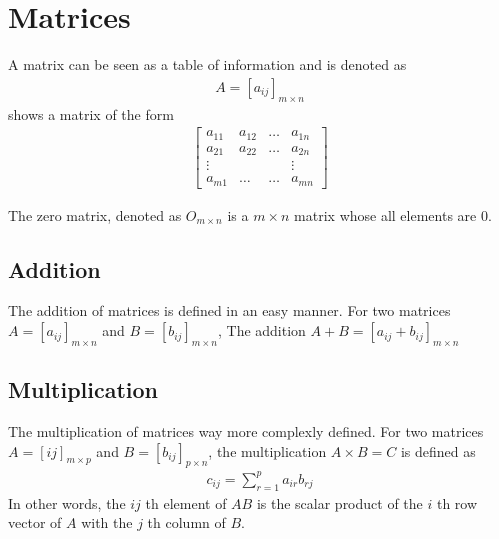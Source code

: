 \documentclass[a4paper]{article}
\theoremstyle{plain}
\theoremstyle{definition}
\newtheorem{defn}{Definition}[section]
\theoremstyle{remark}
\begin{document}
\section{Matrices}
\begin{tcolorbox}[colback=black!3!white,colframe=black!60!white,title=\begin{defn}Matrix \label{Matrix}\end{defn}]
A matrix can be seen as a table of information and is denoted as
\begin{align}
	A = [a_{ij}]_{m \times n}
\end{align}
shows a matrix of the form
\begin{align} \left[
	\begin{array}{cccc}
		a_{11} & a_{12} & \ldots & a_{1n} \\
		a_{21} & a_{22} & \ldots & a_{2n} \\
		\vdots & & & \vdots \\
		a_{m1} & \ldots & \ldots & a_{mn}
	\end{array}\right]
\end{align}
\end{tcolorbox}
\begin{tcolorbox}[colback=black!3!white,colframe=black!60!white,title=\begin{defn}Zero Matrix \label{Zero Matrix}\end{defn}]
The zero matrix, denoted as $O_{m \times n}$ is a $m \times n$ matrix whose all elements are $0$.
\end{tcolorbox}
\subsection{Addition}
The addition of matrices is defined in an easy manner. For two matrices $A=[a_{ij}]_{m\times n}$ and $B = [b_{ij}]_{m \times n}$, The addition $A+B = [a_{ij}+b_{ij}]_{m \times n}$
\subsection{Multiplication}
The multiplication of matrices way more complexly defined. For two matrices $A = [ij]_{m\times p}$ and $B = [b_{ij}]_{p\times n}$, the multiplication $A \times B = C$ is defined as
\begin{align}
	c_{ij} = \sum_{r=1}^{p} a_{ir}b_{rj}
\end{align}
In other words, the $ij$ th element of $AB$ is the scalar product of the $i$ th row vector of $A$ with the $j$ th column of $B$.
\end{document}
